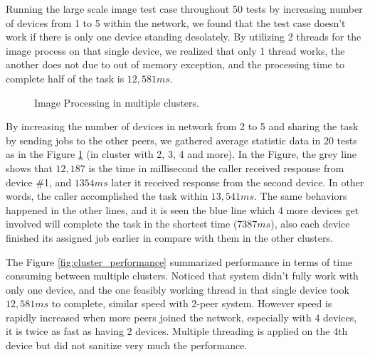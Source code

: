 \documentclass[conference]{IEEEtran}
\begin{document}
Running the large scale image test case throughout 50 tests by increasing number of devices from 1 to 5 within the network, we found that the test case doesn't work if there is only one device standing desolately. By utilizing 2 threads for the image process on that single device, we realized that only 1 thread works, the another does not due to out of memory exception, and the processing time to complete half of the task is $12,581ms$. 

\begin{figure}[H]
	\hspace*{-0.35cm}
	\caption{Image Processing in multiple clusters.}
	\label{fig:cluster_234}
\end{figure}

By increasing the number of devices in network from 2 to 5 and sharing the task by sending jobs to the other peers, we gathered average statistic data in 20 tests as in the Figure \ref{fig:cluster_234} (in cluster with 2, 3, 4 and more). In the Figure, the grey line shows that $12,187$ is the time in millisecond the caller received response from device \#1, and $1354ms$ later it received response from the second device. In other words, the caller accomplished the task within $13,541ms$. The same behaviors happened in the other lines, and it is seen the blue line which 4 more devices get involved will complete the task in the shortest time ($7387ms$), also each device finished its assigned job earlier in compare with them in the other clusters. 

The Figure \ref{fig:cluster_performance} summarized performance in terms of time consuming between multiple clusters. Noticed that system didn't fully work with only one device, and the one feasibly working thread in that single device took $12,581ms$ to complete, similar speed with 2-peer system. However speed is rapidly increased when more peers joined the network, especially with 4 devices, it is twice as fast as having 2 devices. Multiple threading is applied on the 4th device but did not sanitize very much the performance. 
\end{document}
